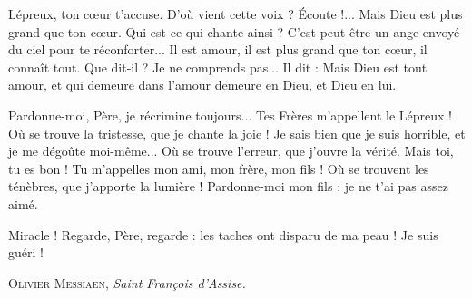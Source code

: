 \documentclass[a5paper,12pt]{article}
\begin{document}

\begin{dialogue}
   Lépreux, ton cœur t'accuse.
   D'où vient cette voix ?
   Écoute !...
   Mais Dieu est plus grand que ton cœur.
   Qui est-ce qui chante ainsi ?
   C'est peut-être un ange envoyé du ciel pour te réconforter...
   Il est amour, il est plus grand que ton cœur, il connaît tout.
   Que dit-il ? Je ne comprends pas...
   Il dit : 
   Mais Dieu est tout amour, et qui demeure dans l'amour demeure en Dieu, et Dieu en lui.
\end{dialogue}


\begin{dialogue}
   Pardonne-moi, Père, je récrimine toujours... Tes Frères m'appellent le Lépreux !
   Où se trouve la tristesse, que je chante la joie !
   Je sais bien que je suis horrible, et je me dégoûte moi-même...
   Où se trouve l'erreur, que j'ouvre la vérité.
   Mais toi, tu es bon ! Tu m'appelles mon ami, mon frère, mon fils !
   Où se trouvent les ténèbres, que j'apporte la lumière ! Pardonne-moi mon fils : je ne t'ai pas assez aimé.
\end{dialogue}


\begin{dialogue}
   Miracle ! Regarde, Père, regarde : les taches ont disparu de ma peau ! Je suis guéri !
\end{dialogue}

\begin{flushright}
\large
\textsc{Olivier Messiaen}, \textit{Saint François d'Assise.}
\end{flushright}
\end{document}
